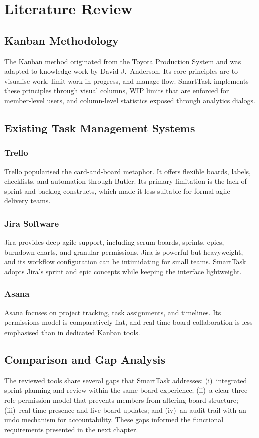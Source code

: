 \documentclass[12pt,a4paper]{report}
\begin{document}
\chapter{Literature Review}
\label{ch:lit}

\section{Kanban Methodology}
The Kanban method originated from the Toyota Production System and was adapted to
knowledge work by David J.~Anderson. Its core principles are to visualise work,
limit work in progress, and manage flow. SmartTask implements these principles
through visual columns, WIP limits that are enforced for member-level users, and
column-level statistics exposed through analytics dialogs.

\section{Existing Task Management Systems}
\subsection{Trello}
Trello popularised the card-and-board metaphor. It offers flexible boards, labels,
checklists, and automation through Butler. Its primary limitation is the lack of
sprint and backlog constructs, which made it less suitable for formal agile
delivery teams.
\subsection{Jira Software}
Jira provides deep agile support, including scrum boards, sprints, epics,
burndown charts, and granular permissions. Jira is powerful but heavyweight, and
its workflow configuration can be intimidating for small teams. SmartTask adopts
Jira's sprint and epic concepts while keeping the interface lightweight.
\subsection{Asana}
Asana focuses on project tracking, task assignments, and timelines. Its
permissions model is comparatively flat, and real-time board collaboration is less
emphasised than in dedicated Kanban tools.

\section{Comparison and Gap Analysis}
The reviewed tools share several gaps that SmartTask addresses: (i)~integrated
sprint planning and review within the same board experience; (ii)~a clear
three-role permission model that prevents members from altering board structure;
(iii)~real-time presence and live board updates; and (iv)~an audit trail with an
undo mechanism for accountability. These gaps informed the functional
requirements presented in the next chapter.
\end{document}
